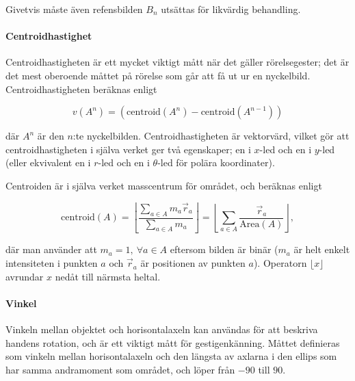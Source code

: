 \documentclass[klassificering]{subfiles}
\begin{document}
Givetvis måste även refensbilden $B_n$ utsättas för likvärdig behandling.

\paragraph{Centroidhastighet}

Centroidhastigheten är ett mycket viktigt mått när det gäller
rörelsegester; det är det mest oberoende måttet på rörelse som går att
få ut ur en nyckelbild. Centroidhastigheten beräknas enligt

\begin{equation*}
  v(A^n) = \left(\textrm{centroid}(A^n)-\textrm{centroid}(A^{n-1})\right)
\end{equation*}

där $A^n$ är den $n$:te nyckelbilden. Centroidhastigheten är
vektorvärd, vilket gör att centroidhastigheten i själva
verket ger två egenskaper; en i $x$-led och en i $y$-led (eller
ekvivalent en i $r$-led och en i $\theta$-led för polära
koordinater).

Centroiden är i själva verket masscentrum för området, och
beräknas enligt

\begin{equation*}
  \textrm{centroid}(A) = \left\lfloor\frac{
    \sum\limits_{a\in A}m_a\vec{r}_a
  }{
    \sum\limits_{a\in A}m_a
  }\right\rfloor =
  \left\lfloor\sum\limits_{a\in
  A}\frac{\vec{r}_a}{\textrm{Area}(A)}\right\rfloor,
\end{equation*}

där man använder att $m_a=1,\:\forall a\in A$ eftersom bilden är
binär ($m_a$ är helt enkelt intensiteten i punkten $a$ och
$\vec{r}_a$ är positionen av punkten $a$). Operatorn $\lfloor
x\rfloor$ avrundar $x$ nedåt till närmsta heltal.


\paragraph{Vinkel}
\label{sss:vinkel}

Vinkeln mellan objektet och horisontalaxeln kan användas för att
beskriva handens rotation, och är ett viktigt mått för
gestigenkänning. Måttet definieras som vinkeln mellan horisontalaxeln
och den längsta av axlarna i den ellips som har samma andramoment som
området, och löper från $-90$\textdegree{} till $90$\textdegree{}.

\end{document}
